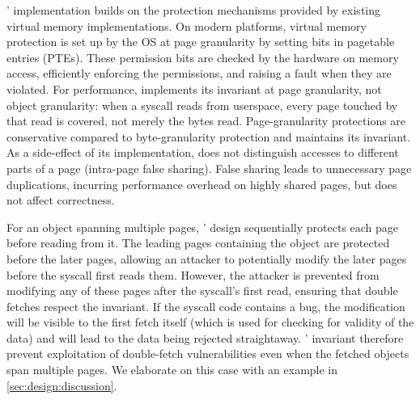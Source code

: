 \midas' implementation builds on the protection mechanisms provided by
existing virtual memory implementations.
On modern platforms, virtual memory protection is set up by the OS at
page granularity by setting bits in pagetable entries (PTEs).
These permission bits are checked by the hardware on memory access,
efficiently enforcing the permissions, and raising a fault when they
are violated.
For performance, \midas implements its invariant at page granularity, not object
granularity: when a syscall reads from userspace, every page touched by that
read is covered, not merely the bytes read.
Page-granularity protections are conservative compared to byte-granularity
protection and \midas maintains its invariant.
As a side-effect of its implementation, \midas does not distinguish
accesses to different parts of a page (intra-page false sharing).
False sharing leads to unnecessary page duplications, incurring performance
overhead on highly shared pages, but does not affect correctness.

For an object spanning multiple pages, \midas' design sequentially
protects each page before reading from it.
The leading pages containing the object are protected before the
later pages, allowing an attacker to potentially modify the later
pages before the syscall first reads them.
However, the attacker is prevented from modifying any of these pages
after the syscall's first read, ensuring that double fetches respect
the invariant.
If the syscall code contains a \tocttou bug, the modification will
be visible to the first fetch itself (which is used for checking for
validity of the data) and will lead to the data being rejected
straightaway.
\midas' invariant therefore prevent exploitation of double-fetch
vulnerabilities even when the fetched objects span multiple pages.
We elaborate on this case with an example in \autoref{sec:design:discussion}.

